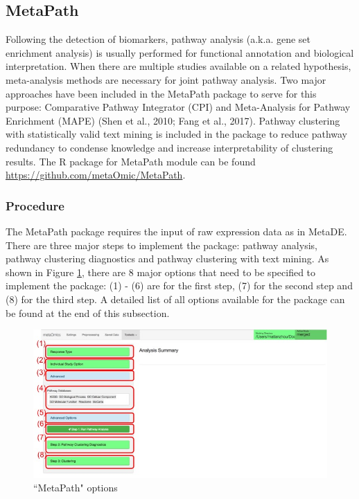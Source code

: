 \subsection{MetaPath}

Following the detection of biomarkers, pathway analysis (a.k.a. gene set enrichment analysis) is usually performed for functional annotation and biological interpretation. When there are multiple studies available on a related hypothesis, meta-analysis methods are necessary for joint pathway analysis. Two major approaches have been included in the MetaPath package to serve for this purpose: Comparative Pathway Integrator (CPI) and Meta-Analysis for Pathway Enrichment (MAPE) (Shen et al., 2010; Fang et al., 2017). Pathway clustering with statistically valid text mining is included in the package to reduce pathway redundancy to condense knowledge and increase interpretability of clustering results. 
The R package for MetaPath module can be found \url{https://github.com/metaOmic/MetaPath}.

\subsubsection{Procedure}
The MetaPath package requires the input of raw expression data as in MetaDE. There are three major steps to implement the package: pathway analysis, pathway clustering diagnostics and pathway clustering with text mining. As shown in Figure \ref{fig:MetaPathoption}, there are 8 major options that need to be specified to implement the package: (1) - (6) are for the first step, (7) for the second step and (8) for the third step. A detailed list of all options available for the package can be found at the end of this subsection. 

\begin{figure}[H]
\begin{center}
\includegraphics[scale=0.45]{./figure/metaPath/metaPathoption.jpg}
\caption{``MetaPath" options}
\label{fig:MetaPathoption}
\end{center}
\end{figure}

